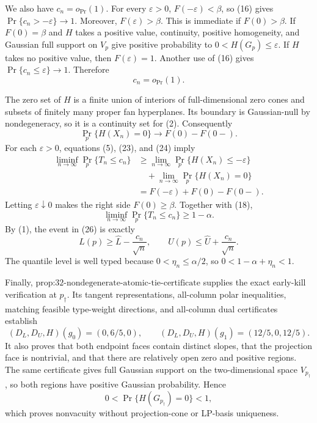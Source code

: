 We also have \(c_n=o_{\Pr}(1)\). For every \(\varepsilon>0\), \(F(-\varepsilon)<\beta\), so (16) gives \(\Pr\{c_n> -\varepsilon\}\to1\). Moreover, \(F(\varepsilon)>\beta\). This is immediate if \(F(0)>\beta\). If \(F(0)=\beta\) and \(H\) takes a positive value, continuity, positive homogeneity, and Gaussian full support on \(V_p\) give positive probability to \(0<H(G_p)\leq\varepsilon\). If \(H\) takes no positive value, then \(F(\varepsilon)=1\). Another use of (16) gives \(\Pr\{c_n\leq\varepsilon\}\to1\). Therefore
\[
c_n=o_{\Pr}(1).
\tag{24}
\]

The zero set of \(H\) is a finite union of interiors of full-dimensional zero cones and subsets of finitely many proper fan hyperplanes. Its boundary is Gaussian-null by nondegeneracy, so it is a continuity set for (2). Consequently
\[
\Pr_p\{H(X_n)=0\}\longrightarrow F(0)-F(0-).
\tag{25}
\]
For each \(\varepsilon>0\), equations (5), (23), and (24) imply
\[
\begin{aligned}
\liminf_{n\to\infty}\Pr_p\{T_n\leq c_n\}
&\geq \lim_{n\to\infty}\Pr_p\{H(X_n)\leq-\varepsilon\}\\
&\quad+\lim_{n\to\infty}\Pr_p\{H(X_n)=0\}\\
&=F(-\varepsilon)+F(0)-F(0-).
\end{aligned}
\]
Letting \(\varepsilon\downarrow0\) makes the right side \(F(0)\geq\beta\). Together with (18),
\[
\liminf_{n\to\infty}\Pr_p\{T_n\leq c_n\}\geq1-\alpha.
\tag{26}
\]
By (1), the event in (26) is exactly
\[
L(p)\geq\widehat L-\frac{c_n}{\sqrt n},
\qquad
U(p)\leq\widehat U+\frac{c_n}{\sqrt n}.
\]
The quantile level is well typed because \(0<\eta_n\leq\alpha/2\), so \(0<1-\alpha+\eta_n<1\).

Finally, \(\text{prop:32-nondegenerate-atomic-tie-certificate}\) supplies the exact early-kill verification at \(p_\dagger\). Its tangent representations, all-column polar inequalities, matching feasible type-weight directions, and all-column dual certificates establish
\[
(D_L,D_U,H)(g_0)=(0,6/5,0),
\qquad
(D_L,D_U,H)(g_1)=(12/5,0,12/5).
\]
It also proves that both endpoint faces contain distinct slopes, that the projection face is nontrivial, and that there are relatively open zero and positive regions. The same certificate gives full Gaussian support on the two-dimensional space \(V_{p_\dagger}\), so both regions have positive Gaussian probability. Hence
\[
0<\Pr\{H(G_{p_\dagger})=0\}<1,
\]
which proves nonvacuity without projection-cone or LP-basis uniqueness.